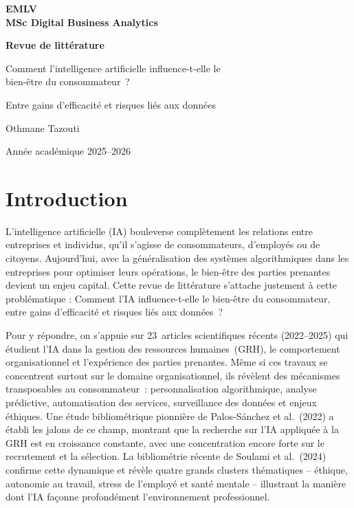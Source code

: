 \documentclass[12pt,a4paper]{article}
\begin{document}
\begin{titlepage}
  \centering
  \vspace*{2cm}
  {\Large\bfseries EMLV\\[0.4em]MSc Digital Business Analytics\par}
  \vspace{2cm}
  {\LARGE\bfseries Revue de littérature\par}
  \vspace{1cm}
  {\Large Comment l'intelligence artificielle influence-t-elle le\\[0.3em]
  bien-être du consommateur~?\par}
  \vspace{0.5cm}
  {\large Entre gains d'efficacité et risques liés aux données\par}
  \vspace{2cm}
  {\large Othmane Tazouti\par}
  \vspace{1cm}
  {\large Année académique 2025--2026\par}
\end{titlepage}

\tableofcontents
\newpage

\section{Introduction}

L'intelligence artificielle (IA) bouleverse complètement les relations entre entreprises et
individus, qu'il s'agisse de consommateurs, d'employés ou de citoyens. Aujourd'hui, avec
la généralisation des systèmes algorithmiques dans les entreprises pour optimiser leurs
opérations, le bien-être des parties prenantes devient un enjeu capital. Cette revue de
littérature s'attache justement à cette problématique : Comment l'IA influence-t-elle le
bien-être du consommateur, entre gains d'efficacité et risques liés aux données~?

Pour y répondre, on s'appuie sur 23~articles scientifiques récents (2022--2025) qui étudient
l'IA dans la gestion des ressources humaines~(GRH), le comportement organisationnel
et l'expérience des parties prenantes. Même si ces travaux se concentrent surtout sur le
domaine organisationnel, ils révèlent des mécanismes transposables au consommateur~:
personnalisation algorithmique, analyse prédictive, automatisation des services, surveillance
des données et enjeux éthiques. Une étude bibliométrique pionnière de Palos-Sánchez
et al.~(2022) a établi les jalons de ce champ, montrant que la recherche sur l'IA
appliquée à la GRH est en croissance constante, avec une concentration encore forte sur
le recrutement et la sélection. La bibliométrie récente de Soulami et al.~(2024) confirme
cette dynamique et révèle quatre grands clusters thématiques -- éthique, autonomie au
travail, stress de l'employé et santé mentale -- illustrant la manière dont l'IA façonne
profondément l'environnement professionnel.
\end{document}
